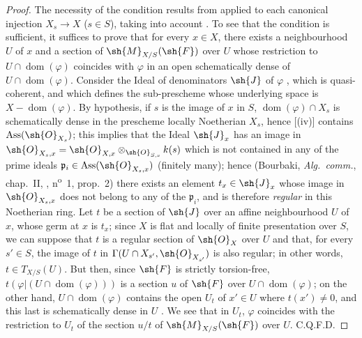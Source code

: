 \begin{proof}
The necessity of the condition results from  applied to each canonical injection $X_s\to X$ ($s\in S$), taking into account .
To see that the condition is sufficient, it suffices to prove that for every $x\in X$, there exists a neighbourhood $U$ of $x$ and a section of $\sh{M}_{X/S}(\sh{F})$ over $U$ whose restriction to $U\cap\operatorname{dom}(\varphi)$ coincides with $\varphi$ in an open schematically dense of $U\cap\operatorname{dom}(\varphi)$.
Consider the Ideal of denominators $\sh{J}$ of $\varphi$ , which is quasi-coherent, and which defines the sub-prescheme whose underlying space is $X-\operatorname{dom}(\varphi)$.
By hypothesis, if $s$ is the image of $x$ in $S$, $\operatorname{dom}(\varphi)\cap X_s$ is schematically dense in the prescheme locally Noetherian $X_s$, hence [(iv)] contains $\operatorname{Ass}(\sh{O}_{X_s})$;
this implies that the Ideal $\sh{J}_x$ has an image in $\sh{O}_{X_s,x}=\sh{O}_{X,x}\otimes_{\sh{O}_{S,s}}k(s)$ which is not contained in any of the prime ideals $\mathfrak{p}_i\in\operatorname{Ass}(\sh{O}_{X_s,x})$ (finitely many);
hence (Bourbaki, \emph{Alg.~comm.}, chap.~II, , n\textsuperscript{o}~1, prop.~2) there exists an element $t_x\in\sh{J}_x$ whose image in $\sh{O}_{X_s,x}$ does not belong to any of the $\mathfrak{p}_i$, and is therefore \emph{regular} in this Noetherian ring.
Let $t$ be a section of $\sh{J}$ over an affine neighbourhood $U$ of $x$, whose germ at $x$ is $t_x$;
since $X$ is flat and locally of finite presentation over $S$, we can suppose  that $t$ is a regular section of $\sh{O}_X$ over $U$ and that, for every $s'\in S$, the image of $t$ in $\Gamma(U\cap X_{s'},\sh{O}_{X_{s'}})$ is also regular;
in other words, $t\in T_{X/S}(U)$.
But then, since $\sh{F}$ is strictly torsion-free, $t(\varphi|(U\cap\operatorname{dom}(\varphi)))$ is a section $u$ of $\sh{F}$ over $U\cap\operatorname{dom}(\varphi)$;
on the other hand, $U\cap\operatorname{dom}(\varphi)$ contains the open $U_t$ of $x'\in U$ where $t(x')\neq 0$, and this last is schematically dense in $U$ .
We see that in $U_t$, $\varphi$ coincides with the restriction to $U_t$ of the section $u/t$ of $\sh{M}_{X/S}(\sh{F})$ over $U$.
C.Q.F.D.
\end{proof}

